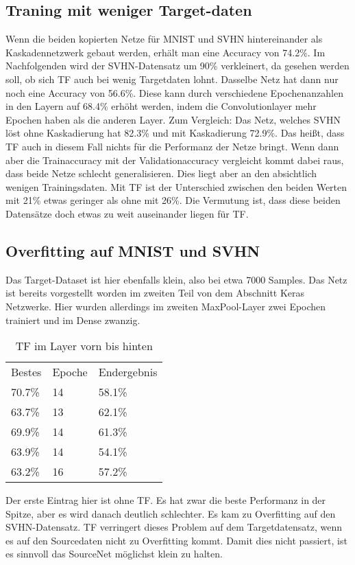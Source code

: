 \subsection{Traning mit weniger Target-daten}
    Wenn die beiden kopierten Netze für MNIST und SVHN hintereinander 
    als Kaskadennetzwerk gebaut werden, erhält man eine Accuracy von 
    74.2\%.
    Im Nachfolgenden wird der SVHN-Datensatz um 90\% verkleinert, da 
    gesehen werden soll, ob sich TF auch bei wenig Targetdaten lohnt. 
    Dasselbe Netz hat dann nur noch eine Accuracy von 56.6\%. Diese kann 
    durch verschiedene Epochenanzahlen in den Layern auf 68.4\% erhöht werden, 
    indem die Convolutionlayer mehr Epochen haben als die anderen Layer.
    Zum Vergleich: 
    Das Netz, welches SVHN löst ohne Kaskadierung hat 82.3\% und mit Kaskadierung 
    72.9\%. Das heißt, dass TF auch in diesem Fall nichts für die Performanz 
    der Netze bringt. 
    Wenn dann aber die Trainaccuracy mit der Validationaccuracy vergleicht kommt 
    dabei raus, dass beide Netze schlecht generalisieren. Dies liegt aber an den 
    absichtlich wenigen Trainingsdaten. Mit TF ist der Unterschied zwischen den 
    beiden Werten mit 21\% etwas geringer als ohne mit 26\%.
    Die Vermutung ist, dass diese beiden Datensätze doch etwas zu weit 
    auseinander liegen für TF.

\subsection{Overfitting auf MNIST und SVHN}
    Das Target-Dataset ist hier ebenfalls klein, also bei etwa 7000 Samples. 
    Das Netz ist bereits vorgestellt worden im zweiten Teil von dem 
    Abschnitt Keras Netzwerke. Hier wurden allerdings im zweiten MaxPool-Layer 
    zwei Epochen trainiert und im Dense zwanzig. 
    \begin{table}[h!]
        \begin{center}
            \caption{TF im Layer vorn bis hinten}
            \label{tab5:Table}
            \begin{tabular}{l|l|l}
                Bestes & Epoche & Endergebnis \\
                70.7\% & 14 & 58.1\% \\
                63.7\% & 13 & 62.1\% \\
                69.9\% & 14 & 61.3\% \\
                63.9\% & 14 & 54.1\% \\
                63.2\% & 16 & 57.2\% \\
            \end{tabular}
        \end{center}
    \end{table}
    Der erste Eintrag hier ist ohne TF. Es hat zwar die beste Performanz in der Spitze, 
    aber es wird danach deutlich schlechter. Es kam zu Overfitting auf den SVHN-Datensatz. 
    TF verringert dieses Problem auf dem Targetdatensatz, wenn es auf 
    den Sourcedaten nicht zu Overfitting kommt. Damit dies nicht passiert, ist es sinnvoll das 
    SourceNet möglichst klein zu halten. 
